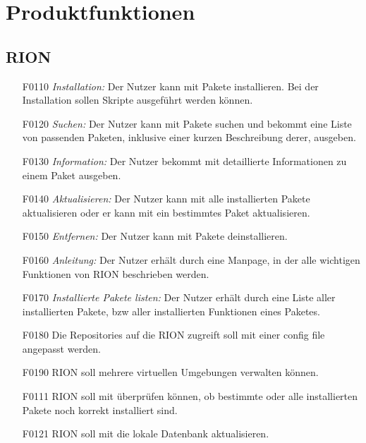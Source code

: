 \chapter{Produktfunktionen}

\section{RION}

\begin{itemize}
	\item[F0110] \textit{Installation:} Der Nutzer kann mit  Pakete installieren. Bei der Installation sollen Skripte ausgeführt werden können.
	\item[F0120] \textit{Suchen:} Der Nutzer kann mit  Pakete suchen und bekommt eine Liste von passenden Paketen, inklusive einer kurzen Beschreibung derer, ausgeben.
	\item[F0130] \textit{Information:} Der Nutzer bekommt mit  detaillierte Informationen zu einem Paket ausgeben.
	\item[F0140] \textit{Aktualisieren:} Der Nutzer kann mit  alle installierten Pakete aktualisieren oder er kann mit  ein bestimmtes Paket aktualisieren.
	\item[F0150] \textit{Entfernen:} Der Nutzer kann mit  Pakete deinstallieren.
	\item[F0160] \textit{Anleitung:} Der Nutzer erhält durch  eine Manpage, in der alle wichtigen Funktionen von RION beschrieben werden.
	\item[F0170] \textit{Installierte Pakete listen:} Der Nutzer erhält durch  eine Liste aller installierten Pakete, bzw aller installierten Funktionen eines Paketes.
	\item[F0180] Die Repositories auf die RION zugreift soll mit einer config file angepasst werden.
	\item[F0190] RION soll mehrere virtuellen Umgebungen verwalten können. 
	\item[F0111] RION soll mit 	 überprüfen können, ob bestimmte oder alle installierten Pakete noch korrekt installiert sind.
	\item[F0121] RION soll mit  die lokale Datenbank aktualisieren.
\end{itemize}

